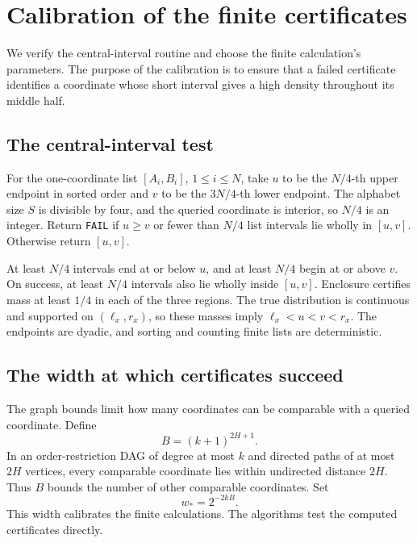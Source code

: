 \section{Calibration of the finite certificates}\label{app:certificates}

We verify the central-interval routine and choose the finite calculation's
parameters. The purpose of the calibration is to ensure that a failed
certificate identifies a coordinate whose short interval gives a high density throughout its
middle half.

\subsection{The central-interval test}

For the one-coordinate list $[A_i,B_i]$, $1\le i\le N$, take $u$ to be
the $N/4$-th upper endpoint in sorted order and $v$ to be the $3N/4$-th
lower endpoint. The alphabet size $S$ is divisible by four, and the queried
coordinate is interior, so $N/4$ is an integer. Return \texttt{FAIL} if
$u\ge v$ or fewer than $N/4$ list intervals lie wholly in $[u,v]$.
Otherwise return $[u,v]$.

At least $N/4$ intervals end at or below $u$, and at least $N/4$ begin
at or above $v$. On success, at least $N/4$ intervals also lie wholly
inside $[u,v]$. Enclosure certifies mass at least $1/4$ in each of the
three regions. The true distribution is continuous and supported on
$(\ell_x,r_x)$, so these masses imply $\ell_x<u<v<r_x$.
The endpoints are dyadic, and sorting and counting finite lists are
deterministic.

\subsection{The width at which certificates succeed}

The graph bounds limit how many coordinates can be comparable with a
queried coordinate. Define
\begin{equation}\label{eq:comparable-bound}
B=(k+1)^{2H+1}.
\end{equation}
In an order-restriction DAG of degree at most $k$ and directed paths of at most
$2H$ vertices, every comparable coordinate lies within undirected distance
$2H$. Thus $B$ bounds the number of other comparable coordinates.
Set
\begin{equation}\label{eq:width-threshold}
w_*=2^{-2kB}.
\end{equation}
This width calibrates the finite calculations. The algorithms test the
computed certificates directly.

